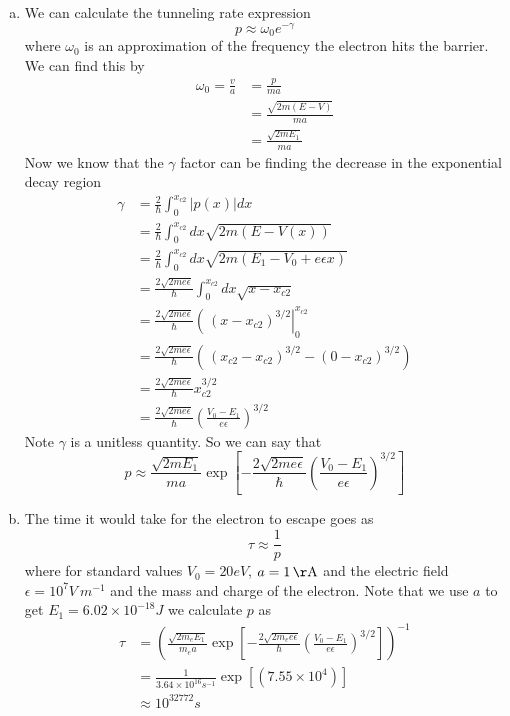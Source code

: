 \documentclass[11pt]{article}
\numberwithin{equation}{section}
\begin{document}
\begin{enumerate}[(a)]
\item
We can calculate the tunneling rate expression 
$$p \approx \omega_0e^{-\gamma}$$
where $\omega_0$ is an approximation of the frequency the electron hits the barrier. We can find this by
\begin{align*}
\omega_0 = \frac{v}{a} &= \frac{p}{ma}\\
&= \frac{\sqrt{2m(E-V)}}{ma}\\
&= \frac{\sqrt{2mE_1}}{ma}
\end{align*}
Now we know that the $\gamma$ factor can be finding the decrease in the exponential decay region
\begin{align*}
\gamma &= \frac{2}{\hbar}\int_{0}^{x_{c2}}|p(x)|dx\\
&= \frac{2}{\hbar}\int_{0}^{x_{c2}}dx\sqrt{2m(E-V(x))}\\
&= \frac{2}{\hbar}\int_{0}^{x_{c2}}dx\sqrt{2m(E_1 - V_0 + e\epsilon x)}\\
&= \frac{2\sqrt{2me\epsilon}}{\hbar}\int_{0}^{x_{c2}}dx\sqrt{x-x_{c2}}\\
&= \frac{2\sqrt{2me\epsilon}}{\hbar}\left(\frac{}{}(x-x_{c2})^{3/2}\right|_{0}^{x_{c2}}\\
&= \frac{2\sqrt{2me\epsilon}}{\hbar}\left(\frac{}{}(x_{c2}-x_{c2})^{3/2}-(0 - x_{c2})^{3/2}\right)\\
&= \frac{2\sqrt{2me\epsilon}}{\hbar}x_{c2}^{3/2}\\
&= \frac{2\sqrt{2me\epsilon}}{\hbar}\left(\frac{V_0-E_1}{e\epsilon}\right)^{3/2}
\end{align*}
Note $\gamma$ is a unitless quantity. So we can say that
$$p\approx \frac{\sqrt{2mE_1}}{ma}\exp\left[-\frac{2\sqrt{2me\epsilon}}{\hbar}\left(\frac{V_0-E_1}{e\epsilon}\right)^{3/2}\right]$$

\item
The time it would take for the electron to escape goes as
$$\tau \approx \frac{1}{p}$$
where for standard values $V_0 = 20\unit{eV}$, $a=1\unit{\AA}$ and the electric field $\epsilon = 10^7\unit{V\ m^{-1}}$ and the mass and charge of the electron. Note that we use $a$ to get $E_1 = 6.02\times10^{-18}\unit{J}$ we calculate $p$ as
\begin{align*}
\tau &= \left(\frac{\sqrt{2m_eE_1}}{m_ea}\exp\left[-\frac{2\sqrt{2m_ee\epsilon}}{\hbar}\left(\frac{V_0-E_1}{e\epsilon}\right)^{3/2}\right]\right)^{-1}\\
&= \frac{1}{3.64\times10^{16}\unit{s^{-1}}}\exp\left[(7.55\times10^{4})\right]\\
&\approx 10^{32772}\unit{s} 
\end{align*}
\end{enumerate}
\end{document}
